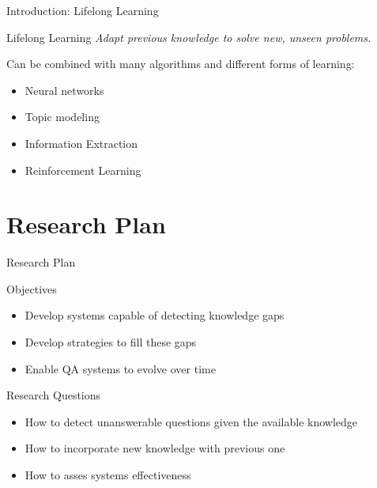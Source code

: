 \documentclass{beamer}
\begin{document}
\begin{frame}{Introduction: Lifelong Learning}
  \begin{block}{Lifelong Learning}
    \vspace{0.2cm}
    \textit{Adapt previous knowledge to solve new, unseen problems.} \par

    Can be combined with many algorithms and different forms of learning:
    \begin{itemize}
      \item Neural networks
      \item Topic modeling
      \item Information Extraction
      \item Reinforcement Learning
    \end{itemize}
  \end{block}
\end{frame}

\section{Research Plan}
\begin{frame}{Research Plan}
  \begin{alertblock}{Objectives}
    \begin{itemize}
      \item Develop systems capable of detecting knowledge gaps
      \item Develop strategies to fill these gaps
      \item Enable QA systems to evolve over time
    \end{itemize}
  \end{alertblock}
  \begin{alertblock}{Research Questions}
    \begin{itemize}
      \item How to detect unanswerable questions given the available knowledge
      \item How to incorporate new knowledge with previous one
      \item How to asses systems effectiveness
    \end{itemize}
  \end{alertblock}
\end{frame}

\end{document}

